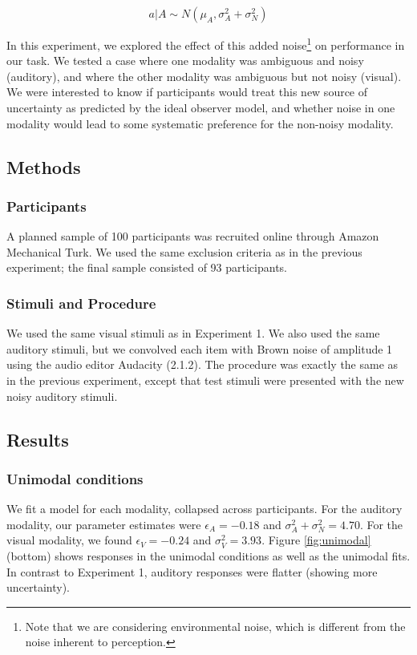 \documentclass[10pt,letterpaper]{article}
\begin{document}
\begin{equation}
a | A \sim N(\mu_{A}, \sigma^2_{A}+\sigma^2_{N})
\end{equation}

In this experiment, we explored the effect of this added noise\footnote{Note that we are considering environmental noise, which is different from the noise inherent to perception.} on performance in our task. We tested a case where one modality was ambiguous and noisy (auditory), and where the other modality was ambiguous but not noisy (visual). We were interested to know if participants would treat this new source of uncertainty as predicted by the ideal observer model, and whether noise in one modality would lead to some systematic preference for the non-noisy modality.

\subsection{Methods}

\subsubsection{Participants}

A planned sample of 100 participants was recruited online through Amazon Mechanical Turk. We used the same exclusion criteria as in the previous experiment; the final sample consisted of 93 participants.

\subsubsection{Stimuli and Procedure}

We used the same visual stimuli as in Experiment 1. We also used the same auditory stimuli, but we convolved each item with Brown noise of amplitude 1 using the audio editor Audacity (2.1.2).  The procedure was exactly the same as in the previous experiment, except that test stimuli were presented with the new noisy auditory stimuli.

\subsection{Results}

\subsubsection{Unimodal conditions}

We fit a model for each modality, collapsed across participants. For the auditory modality, our parameter estimates were $\epsilon_A=-0.18$ and $\sigma^2_A+\sigma^2_N=4.70$. For the visual modality, we found $\epsilon_V=-0.24$ and $\sigma^2_V=3.93$.  Figure \ref{fig:unimodal} (bottom) shows responses in the unimodal conditions as well as the unimodal fits. In contrast to Experiment 1, auditory responses were flatter (showing more uncertainty).
\end{document}
